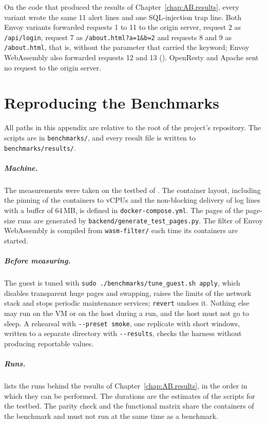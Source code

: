 \documentclass{rptuma}
\begin{document}
On the code that produced the results of Chapter~\ref{chap:AB.results}, every variant wrote the same
11 alert lines and one SQL-injection trap line. Both Envoy variants forwarded requests 1 to 11 to
the origin server, request 2 as \texttt{/api/login}, request 7 as \texttt{/about.html?a=1\&b=2} and
requests 8 and 9 as \texttt{/about.html}, that is, without the parameter that carried the keyword;
Envoy WebAssembly also forwarded requests 12 and 13 (). OpenResty and
Apache sent no request to the origin server.

\FloatBarrier
\chapter{Reproducing the Benchmarks}
\label{app:repro}

All paths in this appendix are relative to the root of the project's repository. The scripts are in
\texttt{benchmarks/}, and every result file is written to \texttt{benchmarks/results/}.

\paragraph{Machine.} The measurements were taken on the testbed of .
The container layout, including the pinning of the containers to vCPUs and the non-blocking delivery
of log lines with a buffer of 64\,MB, is defined in \texttt{docker-compose.yml}. The pages of the
page-size runs are generated by \texttt{backend/generate\_test\_pages.py}. The filter of Envoy
WebAssembly is compiled from \texttt{wasm-filter/} each time its containers are started.

\paragraph{Before measuring.} The guest is tuned with \texttt{sudo ./benchmarks/tune\_guest.sh
apply}, which disables transparent huge pages and swapping, raises the limits of the network stack
and stops periodic maintenance services; \texttt{revert} undoes it. Nothing else may run on the VM
or on the host during a run, and the host must not go to sleep. A rehearsal with
\texttt{-{}-preset smoke}, one replicate with short windows, written to a separate directory with
\texttt{-{}-results}, checks the harness without producing reportable values.

\paragraph{Runs.}  lists the runs behind the results of
Chapter~\ref{chap:AB.results}, in the order in which they can be performed. The durations are the
estimates of the scripts for the testbed. The parity check and the functional matrix share the
containers of the benchmark and must not run at the same time as a benchmark.
\end{document}
